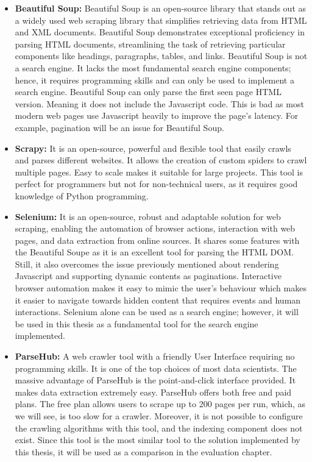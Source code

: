 \begin{itemize}
  \item[] \textbf{Beautiful Soup:} Beautiful Soup is an open-source library that stands out as a widely used web scraping library that simplifies retrieving data from HTML and XML documents. Beautiful Soup demonstrates exceptional proficiency in parsing HTML documents, streamlining the task of retrieving particular components like headings, paragraphs, tables, and links. Beautiful Soup is not a search engine. It lacks the most fundamental search engine components; hence, it requires programming skills and can only be used to implement a search engine. Beautiful Soup can only parse the first seen page HTML version. Meaning it does not include the Javascript code. This is bad as most modern web pages use Javascript heavily to improve the page's latency. For example, pagination will be an issue for Beautiful Soup.

  \item[] \textbf{Scrapy:} It is an open-source, powerful and flexible tool that easily crawls and parses different websites. It allows the creation of custom spiders to crawl multiple pages. Easy to scale makes it suitable for large projects. This tool is perfect for programmers but not for non-technical users, as it requires good knowledge of Python programming.

  \item[] \textbf{Selenium:} It is an open-source, robust and adaptable solution for web scraping, enabling the automation of browser actions, interaction with web pages, and data extraction from online sources. It shares some features with the Beautiful Soupe as it is an excellent tool for parsing the HTML DOM. Still, it also overcomes the issue previously mentioned about rendering Javascript and supporting dynamic contents as paginations. Interactive browser automation makes it easy to mimic the user's behaviour which makes it easier to navigate towards hidden content that requires events and human interactions. Selenium alone can be used as a search engine; however, it will be used in this thesis as a fundamental tool for the search engine implemented.    

  \item[] \textbf{ParseHub:} A web crawler tool with a friendly User Interface requiring no programming skills. It is one of the top choices of most data scientists. The massive advantage of ParseHub is the point-and-click interface provided. It makes data extraction extremely easy. ParseHub offers both free and paid plans. The free plan allows users to scrape up to 200 pages per run, which, as we will see, is too slow for a crawler. Moreover, it is not possible to configure the crawling algorithms with this tool, and the indexing component does not exist. Since this tool is the most similar tool to the solution implemented by this thesis, it will be used as a comparison in the evaluation chapter. 
\end{itemize}

